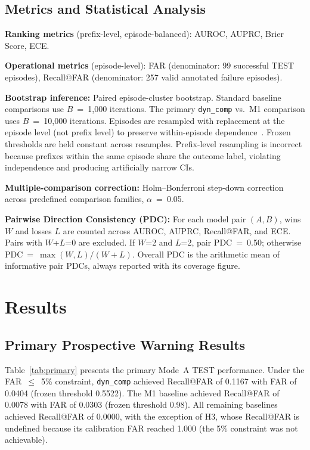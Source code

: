 \documentclass[conference,letterpaper]{IEEEtran}
\begin{document}
\subsection{Metrics and Statistical Analysis}

\textbf{Ranking metrics} (prefix-level, episode-balanced): AUROC, AUPRC,
Brier Score, ECE.

\textbf{Operational metrics} (episode-level): FAR (denominator: 99
successful TEST episodes), Recall@FAR (denominator: 257 valid annotated
failure episodes).

\textbf{Bootstrap inference:} Paired episode-cluster bootstrap. Standard
baseline comparisons use $B$~=~1{,}000 iterations. The primary
\texttt{dyn\_comp} vs.\ M1 comparison uses $B$~=~10{,}000 iterations.
Episodes are resampled with replacement at the episode level (not prefix
level) to preserve within-episode dependence~\cite{b12}. Frozen
thresholds are held constant across resamples. Prefix-level resampling
is incorrect because prefixes within the same episode share the outcome
label, violating independence and producing artificially narrow CIs.

\textbf{Multiple-comparison correction:} Holm--Bonferroni step-down
correction~\cite{b13} across predefined comparison families,
$\alpha$~=~0.05.

\textbf{Pairwise Direction Consistency (PDC):} For each model pair
$(A,B)$, wins $W$ and losses $L$ are counted across AUROC, AUPRC,
Recall@FAR, and ECE. Pairs with $W$+$L$=0 are excluded. If $W$=2 and
$L$=2, pair PDC~=~0.50; otherwise PDC~=~$\max(W,L)/(W+L)$. Overall PDC
is the arithmetic mean of informative pair PDCs, always reported with
its coverage figure.

\section{Results}

\subsection{Primary Prospective Warning Results}

Table~\ref{tab:primary} presents the primary Mode~A TEST performance.
Under the FAR~$\leq$~5\% constraint, \texttt{dyn\_comp} achieved
Recall@FAR of 0.1167 with FAR of 0.0404 (frozen threshold 0.5522).
The M1 baseline achieved Recall@FAR of 0.0078 with FAR of
0.0303 (frozen threshold 0.98). All remaining baselines achieved
Recall@FAR of 0.0000, with the exception of H3, whose Recall@FAR is
undefined because its calibration FAR reached 1.000 (the 5\% constraint
was not achievable).
\end{document}
